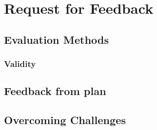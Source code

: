 \chapter{Request for Feedback}\label{C:feedback}

\section{Evaluation Methods}
\subsection{Validity}

\section{Feedback from plan}


\section{Overcoming Challenges}